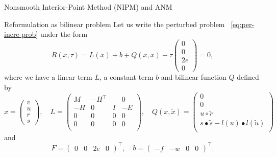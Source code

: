   \begin{frame}{Nonsmooth Interior-Point Method (NIPM) and ANM}
    \begin{block}{Reformulation as bilinear problem}
      Let us write the perturbed problem ~\eqref{eq:per-incre-prob} under the form
      \begin{equation}
        \label{eq:F}
        R(x,\tau) = L(x) + b + Q(x,x) -\tau \begin{pmatrix} 0\\0\\2e \\0\end{pmatrix} = 0,
      \end{equation}
      where we have a linear term $L$, a constant term $b$ and bilinear function $Q$ defined by
\begin{equation}
  \label{eq:18}
  x =
  \begin{pmatrix}
   v \\ u \\ r \\ s 
  \end{pmatrix},\quad
   L =
   \begin{pmatrix}
     M &  -H^\top &   & 0\\
     -H & 0 & I & -E \\
     0 & 0 & 0 & 0 \\
     0 & 0 & 0 & 0\\
  \end{pmatrix},\quad
  Q(x,\tilde x) =
  \begin{pmatrix}
    0 \\
    0 \\
    u \circ \tilde r\\
    s\bullet  \tilde s - l(u) \bullet  l(\tilde u )\\
  \end{pmatrix}
\end{equation}
and
\begin{equation}
   F =
  \begin{pmatrix}
    0 &
    0 &
    2 e &
    0
  \end{pmatrix}^\top,\quad
  b =
  \begin{pmatrix}
    - f&
    - w &
    0 &
    0
  \end{pmatrix}^\top.
\end{equation}
\end{block}
\end{frame}



